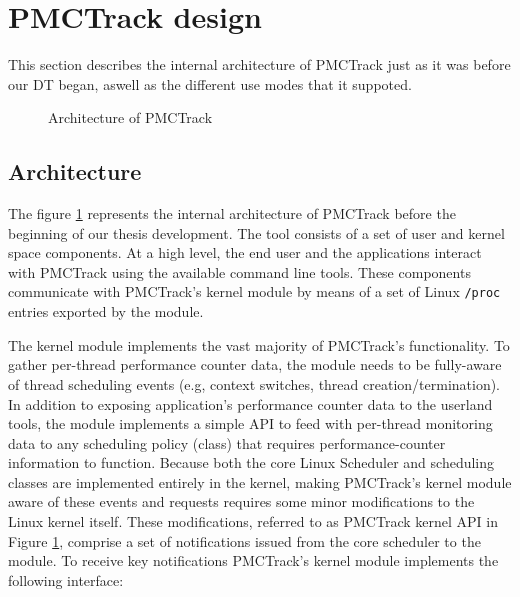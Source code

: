 \section{PMCTrack design}\label{pmctrack-design}

This section describes the internal architecture of PMCTrack just as it
was before our DT began, aswell as the different use modes that it
suppoted.

\begin{figure}[tbp]
\centering
{}

\caption{Architecture of PMCTrack}
\label{fig:arch}
\end{figure}

\subsection{Architecture}\label{architecture}

The figure \ref{fig:arch} represents the internal architecture of
PMCTrack before the beginning of our thesis development. The tool
consists of a set of user and kernel space components. At a high level,
the end user and the applications interact with PMCTrack using the
available command line tools. These components communicate with
PMCTrack's kernel module by means of a set of Linux \texttt{/proc}
entries exported by the module.

The kernel module implements the vast majority of PMCTrack's
functionality. To gather per-thread performance counter data, the module
needs to be fully-aware of thread scheduling events (e.g, context
switches, thread creation/termination). In addition to exposing
application's performance counter data to the userland tools, the module
implements a simple API to feed with per-thread monitoring data to any
scheduling policy (class) that requires performance-counter information
to function. Because both the core Linux Scheduler and scheduling
classes are implemented entirely in the kernel, making PMCTrack's kernel
module aware of these events and requests requires some minor
modifications to the Linux kernel itself. These modifications, referred
to as PMCTrack kernel API in Figure \ref{fig:arch}, comprise a set of
notifications issued from the core scheduler to the module. To receive
key notifications PMCTrack's kernel module implements the following
interface:

